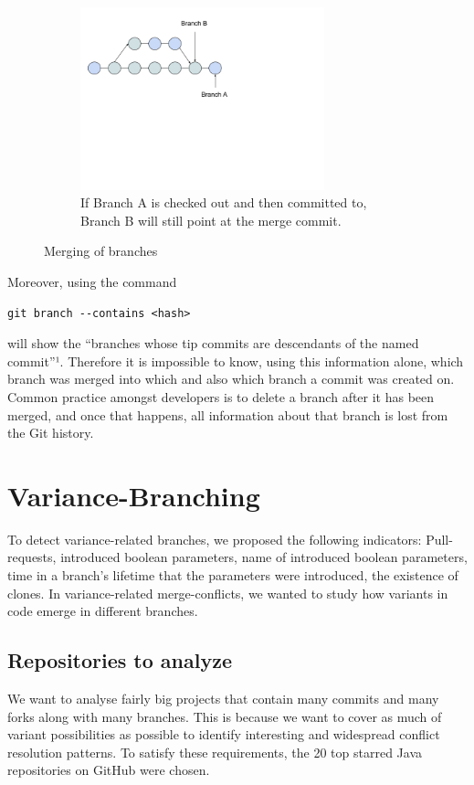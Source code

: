 \begin{figure}
   ~ %
   \begin{subfigure}[b]{0.3\textwidth}
       \includegraphics[width=200pt]{figure/branch3.png}
       \caption{If Branch A is checked out and then committed to, Branch B will still point at the merge commit.}
       \label{fig:mbranch3}
   \end{subfigure}
   \caption{Merging of branches}\label{fig:branches}
\end{figure}

Moreover, using the command
\lstset{language=Bash}
\begin{lstlisting}[frame=single]
git branch --contains <hash>
\end{lstlisting}
will show the “branches whose tip commits are descendants of the named commit”¹. Therefore it is impossible to know, using this information alone, which branch was merged into which and also which branch a commit was created on. Common practice amongst developers is to delete a branch after it has been merged, and once that happens, all information about that branch is lost from the Git history.
\section{Variance-Branching}
To detect variance-related branches, we proposed the following indicators: Pull-requests, introduced boolean parameters, name of introduced boolean parameters, time in a branch’s lifetime that the parameters were introduced, the existence of clones. In variance-related merge-conflicts, we wanted to study how variants in code emerge in different branches.
\subsection{Repositories to analyze}
We want to analyse fairly big projects that contain many commits and many forks along with many branches. This is because we want to cover as much of variant possibilities as possible to identify interesting and widespread conflict resolution patterns. To satisfy these requirements, the 20 top starred Java repositories on GitHub were chosen.

